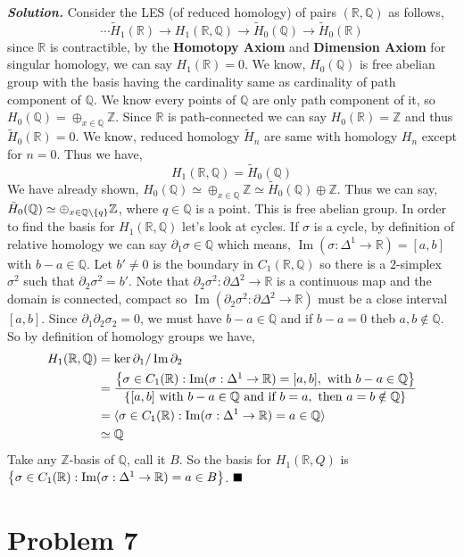 \documentclass[11pt]{article}
\newcommand{\bb}[1]{\mathbb{#1}}
\newcommand{\Z}{\bb{Z}}
\newcommand{\Q}{\bb{Q}}
\newcommand{\R}{\mathbb{R}}
\newcommand{\p}{\partial}
\newcommand{\D}{\Delta}
\newcommand{\sol}{ \textbf{\textit{Solution.}} }
\begin{document}
 \sol Consider the LES (of reduced homology) of pairs $(\R,\Q)$ as follows, 
 $$\cdots \tilde{H}_1(\R) \to {H}_1(\R,\Q) \to \tilde{H}_0(\Q) \to \tilde{H}_0(\R)$$
 since $\R$ is contractible, by the \textbf{Homotopy Axiom} and \textbf{Dimension Axiom} for singular homology, we can say $H_1(\R) = \qty{0}$. We know, $H_0(\Q)$ is free abelian group with the basis having the cardinality same as cardinality of path component of $\Q$. We know every points of $\Q$ are only path component of it, so $H_0(\Q) = \oplus_{x \in \Q} \Z$. Since $\R$ is path-connected we can say $H_0(\R)= \Z$ and thus $\tilde{H}_0(\R)= \qty{0}$. We know, reduced homology $\tilde{H}_n$ are same with homology $H_n$ except for $n =0$. Thus we have, $${H}_1(\R,\Q) = \tilde{H}_0(\Q)$$   
 We have already shown, \(H_0(\Q) \simeq \oplus_{x \in \Q} \Z \simeq \tilde{H}_0(\Q) \oplus \Z\). Thus we can say, \(\tilde{H}_0(\Q) \simeq \oplus_{x \in \Q \setminus \qty{q}} \Z\), where $q \in \Q$ is a point. This is free abelian group. In order to find the basis for $H_1(\R,\Q)$ let's look at cycles. If $\sigma$ is a cycle, by definition of relative homology we can say $\p_1 \sigma \in \Q$ which means, $\operatorname{Im}(\sigma: \D^1 \to \R) = [a,b]$ with $b-a \in \Q$. Let $b'\neq 0$ is the boundary in $C_1(\R,\Q)$ so there is a $2$-simplex $\sigma^2$ such that $\p_2 \sigma^2 = b'$. Note that $\p_2 \sigma^2 : \p \D^2 \to \R$ is a continuous map and the domain is connected, compact so $\operatorname{Im}(\p_2\sigma^2 : \p \D^2 \to \R)$ must be a close interval $[a,b]$. Since $\p_1\p_2 \sigma_2 =0$, we must have $b-a \in \Q$ and if $b-a =0$ theb $a,b \notin \Q$. So by definition of homology groups we have, 
 \begin{align*}
  H_1(\R,\Q) &= \ker \p_1 /\operatorname{Im} \p_2 \\
  &= \frac{\qty{\sigma \in C_1(\R) : \operatorname{Im}(\sigma: \D^1 \to \R) = [a,b], \text{ with } b-a \in \Q}}{\qty{[a,b] \text{ with } b-a \in \Q \text{ and if } b=a, \text{ then } a=b \notin \Q}} \\
  &= \langle \sigma \in C_1(\R) :\operatorname{Im}(\sigma: \D^1 \to \R)= a \in \Q  \rangle \\
  &\simeq \Q
 \end{align*}
 Take any $\Z$-basis of $\Q$, call it $B$. So the basis for $H_1(\R,Q)$ is $\qty{\sigma \in C_1(\R) :\operatorname{Im}(\sigma: \D^1 \to \R)= a \in B}$. $\hfill \blacksquare$ 

 \section{Problem 7}
\end{document}
